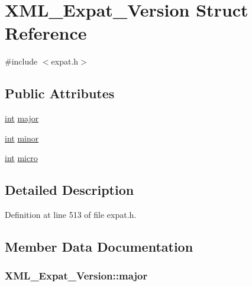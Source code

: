 \hypertarget{struct_x_m_l___expat___version}{}\section{X\+M\+L\+\_\+\+Expat\+\_\+\+Version Struct Reference}
\label{struct_x_m_l___expat___version}


{\ttfamily \#include $<$expat.\+h$>$}

\subsection*{Public Attributes}
\begin{DoxyCompactItemize}
\item 
\hyperlink{xmltok_8h_a5a0d4a5641ce434f1d23533f2b2e6653}{int} \hyperlink{struct_x_m_l___expat___version_a0c16da8d497c8eefd86a1bb4c6ea23b5}{major}
\item 
\hyperlink{xmltok_8h_a5a0d4a5641ce434f1d23533f2b2e6653}{int} \hyperlink{struct_x_m_l___expat___version_ab9b1e025090b5f4e7c8f206c72aeb8b6}{minor}
\item 
\hyperlink{xmltok_8h_a5a0d4a5641ce434f1d23533f2b2e6653}{int} \hyperlink{struct_x_m_l___expat___version_ac6b159560f37010366faaf9531f74929}{micro}
\end{DoxyCompactItemize}


\subsection{Detailed Description}


Definition at line 513 of file expat.\+h.



\subsection{Member Data Documentation}
\subsubsection[{\texorpdfstring{major}{major}}]{ X\+M\+L\+\_\+\+Expat\+\_\+\+Version\+::major}\hypertarget{struct_x_m_l___expat___version_a0c16da8d497c8eefd86a1bb4c6ea23b5}{}\label{struct_x_m_l___expat___version_a0c16da8d497c8eefd86a1bb4c6ea23b5}


